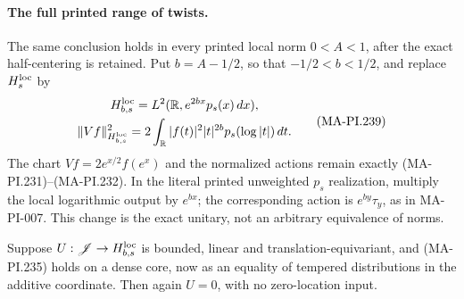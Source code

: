 \paragraph{The full printed range of twists.}
The same conclusion holds in every printed local norm
$0<A<1$, after the exact half-centering is retained.
Put $b=A-1/2$, so that $-1/2<b<1/2$, and replace
$H_s^{\rm loc}$ by
\[
 \begin{gathered}
 H_{b,s}^{\rm loc}=L^2(\mathbb R,e^{2bx}p_s(x)\,dx),\\
 \|Vf\|_{H_{b,s}^{\rm loc}}^2
       =2\int_{\mathbb R}|f(t)|^2|t|^{2b}
                              p_s(\log|t|)\,dt.
 \end{gathered}
 \tag{MA-PI.239}
\]
The chart $Vf=2e^{x/2}f(e^x)$ and the normalized actions
remain exactly (MA-PI.231)--(MA-PI.232). In the literal
printed unweighted $p_s$ realization, multiply the local
logarithmic output by $e^{bx}$; the corresponding action
is $e^{by}\tau_y$, as in MA-PI-007. This change is the
exact unitary, not an arbitrary equivalence of norms.

Suppose $U:\mathscr J\to H_{b,s}^{\rm loc}$ is bounded,
linear and translation-equivariant, and (MA-PI.235) holds
on a dense core, now as an equality of tempered
distributions in the additive coordinate. Then again
$U=0$, with no zero-location input.

